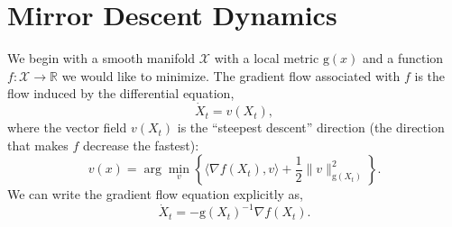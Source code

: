 \documentclass[11pt]{article}
\theoremstyle{plain}
\newcommand{\R}{{\mathbb R}}
\newcommand{\X}{{\mathcal X}}
\begin{document}
 \section{Mirror Descent Dynamics}
 \label{App:Mirror}
 We begin with a smooth manifold $\X$ with a local metric $\mathrm{g}(x)$ and a function $f:\X \rightarrow \R$ we would like to minimize. The gradient flow associated with $f$ is the flow induced by the differential equation,
\begin{equation}
\dot X_t = v(X_t),
\end{equation} where the vector field $v(X_t)$ is the ``steepest descent'' direction (the direction that makes $f$ decrease the fastest):
\begin{equation}
v(x) = \arg \min _v \left\{ \langle \nabla f(X_t), v\rangle + \frac{1}{2}\|v\|_{\mathrm{g}(X_t)}^2\right\}.
\end{equation}
We can write the gradient flow equation explicitly as,
\begin{equation}\label{Eq:ManGradFlow}
\dot X_t = - \mathrm{g}(X_t)^{-1} \nabla f(X_t).
\end{equation}
%
\end{document}
